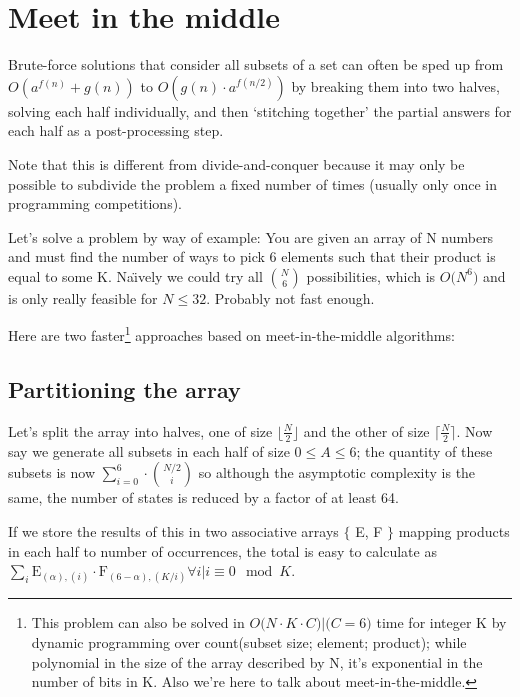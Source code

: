 \section {Meet in the middle}

Brute-force solutions that consider all subsets of a set can often be sped up from $ O(a^{f(n)} + g(n)) $ to
$ O(g(n) \cdot a^{f(n/2)}) $ by breaking them into two halves, solving each half individually, and then `stitching together' the
partial answers for each half as a post-processing step.

Note that this is different from divide-and-conquer because it may only be possible to subdivide the problem a fixed number of times
(usually only once in programming competitions).

Let's solve a problem by way of example: You are given an array of N numbers and must find the number of ways to pick 6 elements
such that their product is equal to some K. Na\"\i vely we could try all $ {N \choose 6} $ possibilities, which is $ O \big( N^6 ) $
and is only really feasible for $ N \le 32 $. Probably not fast enough.

Here are two faster\footnote{This problem can also be solved in $ O \big( N \cdot K \cdot C \big) | \big( C = 6 \big) $
time for integer K by dynamic programming over count(subset size; element; product); while polynomial in the size of the array described by N,
it's exponential in the number of bits in K. Also we're here to talk about meet-in-the-middle.} approaches based on meet-in-the-middle
algorithms:

\subsection {Partitioning the array}

Let's split the array into halves, one of size $ \lfloor \frac{N}{2} \rfloor $ and the other of size $ \lceil \frac{N}{2} \rceil $.
Now say we generate all subsets in each half of size $ 0 \le A \le 6 $; the quantity of these subsets is now
$ \sum_{i=0}^6 \cdot {{N / 2} \choose i} $ so although the asymptotic complexity is the same, the number of states is reduced by a factor
of at least 64.

If we store the results of this in two associative arrays $ \big\{ $ E, F $ \big\} $ mapping products in each half to number of occurrences,
the total is easy to calculate as $ \sum_i \textrm{E}_{(\alpha), (i)} \cdot \textrm{F}_{(6-\alpha), (K / i)} \forall i | i \equiv 0 \mod{K} $.

